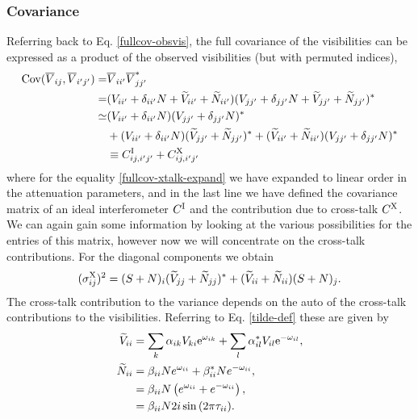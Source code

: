 \subsubsection{Covariance}
Referring back to Eq. \ref{fullcov-obsvis}, the full covariance of the visibilities can be expressed as a product of the observed visibilities (but with permuted indices),
\begin{align}
{\rm Cov}(\overline{V}_{ij}, \overline{V}_{i'j'}) =& \overline{V}_{ii'}\overline{V}_{jj'}^* \label{fullcov-obsvis-xtalk}
\\ =& (V_{ii'} + \delta_{ii'}N + \widetilde{V}_{ii'} + \widetilde{N}_{ii'})(V_{jj'} + \delta_{jj'}N + \widetilde{V}_{jj'} + \widetilde{N}_{jj'})^* 
\\ \simeq &(V_{ii'} + \delta_{ii'}N)(V_{jj'} + \delta_{jj'}N)^*  
\nonumber \\ &+ (V_{ii'} + \delta_{ii'}N)(\widetilde{V}_{jj'} + \widetilde{N}_{jj'})^* + (\widetilde{V}_{ii'} + \widetilde{N}_{ii'})(V_{jj'} + \delta_{jj'}N)^*
\label{fullcov-xtalk-expand} \\ &\equiv C^{\rm I}_{ij, i'j'} + C^{\rm X}_{ij, i'j'}
\end{align}
where for the equality \ref{fullcov-xtalk-expand} we have expanded to linear order in the attenuation parameters, and in the last line we have defined the covariance matrix of an ideal interferometer $C^{\rm I}$ and the contribution due to cross-talk $C^{\rm X}$. We can again gain some information by looking at the various possibilities for the entries of this matrix, however now we will concentrate on the cross-talk contributions. For the diagonal components we obtain
\begin{align}
(\sigma^{\rm X}_{ij})^2 = (S + N)_{i}(\widetilde{V}_{jj} + \widetilde{N}_{jj})^* + (\widetilde{V}_{ii} + \widetilde{N}_{ii})(S + N)_{j}.
\end{align}
The cross-talk contribution to the variance depends on the auto of the cross-talk contributions to the visibilities. Referring to Eq. \ref{tilde-def} these are given by
\begin{align}
\widetilde{V}_{ii} &= \sum_k \alpha_{ik} V_{ki} {\rm e}^{\omega_{ik}} + \sum_l \alpha^*_{il} V_{il} {\rm e}^{-\omega_{il}},
\\ \widetilde{N}_{ii} &= \beta_{ii} N e^{\omega_{ii}} + \beta_{ii}^*N e^{- \omega_{ii}},
\nonumber \\ &= \beta_{ii}N \left( e^{\omega_{ii}} + e^{- \omega_{ii}} \right),
\\ & = \beta_{ii}N 2i \sin{\left( 2\pi \tau_{ii} \right)}.
\end{align}
